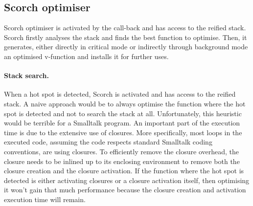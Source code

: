 \documentclass[a4paper,12pt,twoside]{../includes/ThesisStyle}
\begin{document}



\subsection{Scorch optimiser}

Scorch optimiser is activated by the call-back and has access to the reified stack. Scorch firstly analyses the stack and finds the best function to optimise. Then, it generates, either directly in critical mode or indirectly through background mode an optimised v-function and installs it for further uses.


\paragraph{Stack search.}
\label{ss:stackSearch}

When a hot spot is detected, Scorch is activated and has access to the reified stack. A naive approach would be to always optimise the function where the hot spot is detected and not to search the stack at all. Unfortunately, this heuristic would be terrible for a Smalltalk program. An important part of the execution time is due to the extensive use of closures. More specifically, most loops in the executed code, assuming the code respects standard Smalltalk coding conventions, are using closures. To efficiently remove the closure overhead, the closure needs to be inlined up to its enclosing environment to remove both the closure creation and the closure activation. If the function where the hot spot is detected is either activating closures or a closure activation itself, then optimising it won't gain that much performance because the closure creation and activation execution time will remain.
\end{document}
